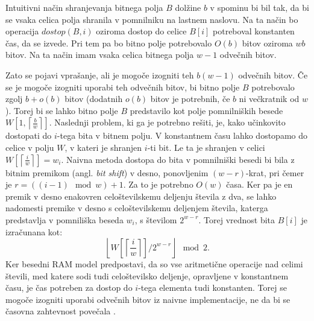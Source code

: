 
Intuitivni način shranjevanja bitnega polja $B$ dolžine $b$ v spominu bi bil tak, da bi se vsaka celica polja shranila v pomnilniku na lastnem naslovu. Na ta način bo operacija $dostop(B,i)$ oziroma dostop do celice $B[i]$ potreboval konstanten čas, da se izvede. Pri tem pa bo bitno polje potrebovalo $O(b)$ bitov oziroma $wb$ bitov. Na ta način imam vsaka celica bitnega polja $w-1$ odvečnih bitov. 

Zato se pojavi vprašanje, ali je mogoče izogniti teh $b(w-1)$ odvečnih bitov. Če se je mogoče izogniti uporabi teh odvečnih bitov, bi bitno polje $B$ potrebovalo zgolj $b+o(b)$ bitov (dodatnih $o(b)$ bitov je potrebnih, če $b$ ni večkratnik od $w$). Torej bi se lahko bitno polje $B$ predstavilo kot polje pomnilniških besede $W\left[1,\left\lceil\frac{b}{w}\right\rceil\right]$. Naslednji problem, ki ga je potrebno rešiti, je, kako učinkovito dostopati do $i$-tega bita v bitnem polju. V konstantnem času lahko dostopamo do celice v polju $W$, v kateri je shranjen $i$-ti bit. Le ta je shranjen v celici $W\left[\left\lceil\frac{i}{w}\right\rceil\right]=w_i$. Naivna metoda dostopa do bita v pomnilniški besedi bi bila z bitnim premikom (angl. \textit{bit shift}) v desno, ponovljenim $(w-r)$-krat, pri čemer je $r=((i-1)\mod{w}) +1$. Za to je potrebno $O(w)$ časa. Ker pa je en premik v desno enakovren celoštevilskemu deljenju števila z dva, se lahko nadomesti premike v desno s celoštevilskemu deljenjem števila, katerga predstavlja v pomniliška beseda $w_i$, s številom $2^{w-r}$. Torej vrednost bita $B[i]$ je izračunana kot:
$$
    \left\lfloor W\left[\left\lceil\frac{i}{w}\right\rceil\right]/2^{w-r}\right\rfloor \mod{2}.
$$
Ker besedni RAM model predpostavi, da so vse aritmetične operacije nad celimi števili, med katere sodi tudi celoštevilsko deljenje, opravljene v konstantnem času, je čas potreben za dostop do $i$-tega elementa tudi konstanten. Torej se mogoče izogniti uporabi odvečnih bitov iz naivne implementacije, ne da bi se časovna zahtevnost povečala \cite{Navarro2016}.


